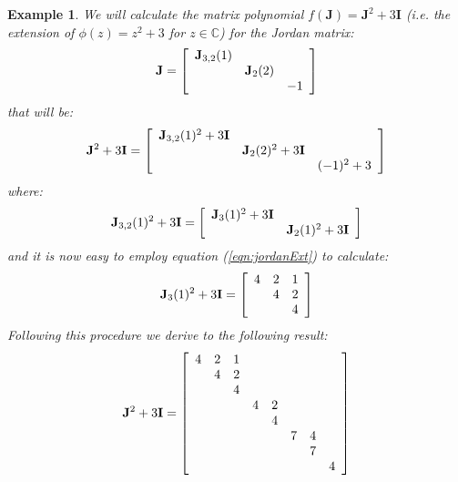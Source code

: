 \documentclass[a4paper,10pt,oneside]{book}
\newtheorem{example}{Example}
\begin{document}
\begin{example}
 We will calculate the matrix polynomial $f(\mathbf{J})=\mathbf{J}^2+3\mathbf{I}$ (i.e. the extension of $\phi(z)=z^2+3$ for $z\in\mathbb{C}$) for the Jordan matrix:
 \begin{equation}
  \mathbf{J}=\left[ {\begin{array}{*{3}c}
 \mathbf{J}_{3,2}(1) \\ 
 & \mathbf{J}_2(2) \\
 && -1
 \end{array} } \right]
 \end{equation}
 that will be:
 \begin{equation}
  \mathbf{J}^2+3\mathbf{I}=\left[ {\begin{array}{*{3}c}
 \mathbf{J}_{3,2}(1)^2+3\mathbf{I} \\ 
 & \mathbf{J}_2(2)^2+3\mathbf{I} \\
 && (-1)^2+3
 \end{array} } \right]
 \end{equation}
where:
\begin{equation}
 \mathbf{J}_{3,2}(1)^2+3\mathbf{I} = \left[ {\begin{array}{*{2}c}
 \mathbf{J}_{3}(1)^2+3\mathbf{I} \\
 & \mathbf{J}_{2}(1)^2+3\mathbf{I}
 \end{array} } \right]
\end{equation}
and it is now easy to employ equation (\ref{eqn:jordanExt}) to calculate:
\begin{equation}
 \mathbf{J}_{3}(1)^2+3\mathbf{I} = \left[ {\begin{array}{*{3}c}
 4 & 2 & 1\\
   & 4 & 2\\
    &  & 4
 \end{array} } \right]
\end{equation}
Following this procedure we derive to the following result:
\begin{equation}
  \mathbf{J}^2+3\mathbf{I}=\left[ {\begin{array}{*{8}c}
 4 & 2 & 1\\
 & 4 & 2\\
&& 4 \\
&&& 4 & 2\\
&&&& 4 \\
&&&&& 7 & 4\\
&&&&&& 7\\
&&&&&&& 4
 \end{array} } \right]
 \end{equation}
\end{example}
\end{document}
